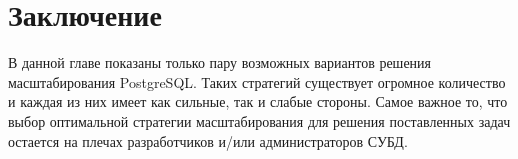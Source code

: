 


\section{Заключение}
В данной главе показаны только пару возможных вариантов решения масштабирования PostgreSQL. Таких стратегий существует огромное количество и каждая из них имеет как сильные, так и слабые стороны. Самое важное то, что выбор оптимальной стратегии масштабирования для решения поставленных задач остается на плечах разработчиков и/или администраторов СУБД.